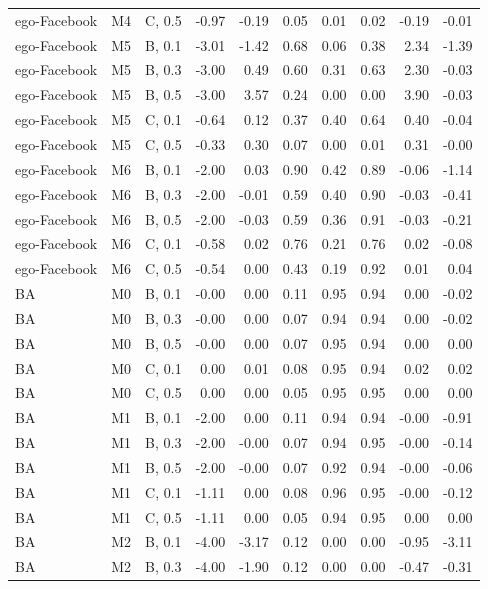 \begin{longtable}{lllrrrrrrr}
ego-Facebook & M4 & C, 0.5 & -0.97 & -0.19 & 0.05 & 0.01 & 0.02 & -0.19 & -0.01 \\
ego-Facebook & M5 & B, 0.1 & -3.01 & -1.42 & 0.68 & 0.06 & 0.38 & 2.34 & -1.39 \\
ego-Facebook & M5 & B, 0.3 & -3.00 & 0.49 & 0.60 & 0.31 & 0.63 & 2.30 & -0.03 \\
ego-Facebook & M5 & B, 0.5 & -3.00 & 3.57 & 0.24 & 0.00 & 0.00 & 3.90 & -0.03 \\
ego-Facebook & M5 & C, 0.1 & -0.64 & 0.12 & 0.37 & 0.40 & 0.64 & 0.40 & -0.04 \\
ego-Facebook & M5 & C, 0.5 & -0.33 & 0.30 & 0.07 & 0.00 & 0.01 & 0.31 & -0.00 \\
ego-Facebook & M6 & B, 0.1 & -2.00 & 0.03 & 0.90 & 0.42 & 0.89 & -0.06 & -1.14 \\
ego-Facebook & M6 & B, 0.3 & -2.00 & -0.01 & 0.59 & 0.40 & 0.90 & -0.03 & -0.41 \\
ego-Facebook & M6 & B, 0.5 & -2.00 & -0.03 & 0.59 & 0.36 & 0.91 & -0.03 & -0.21 \\
ego-Facebook & M6 & C, 0.1 & -0.58 & 0.02 & 0.76 & 0.21 & 0.76 & 0.02 & -0.08 \\
ego-Facebook & M6 & C, 0.5 & -0.54 & 0.00 & 0.43 & 0.19 & 0.92 & 0.01 & 0.04 \\
BA & M0 & B, 0.1 & -0.00 & 0.00 & 0.11 & 0.95 & 0.94 & 0.00 & -0.02 \\
BA & M0 & B, 0.3 & -0.00 & 0.00 & 0.07 & 0.94 & 0.94 & 0.00 & -0.02 \\
BA & M0 & B, 0.5 & -0.00 & 0.00 & 0.07 & 0.95 & 0.94 & 0.00 & 0.00 \\
BA & M0 & C, 0.1 & 0.00 & 0.01 & 0.08 & 0.95 & 0.94 & 0.02 & 0.02 \\
BA & M0 & C, 0.5 & 0.00 & 0.00 & 0.05 & 0.95 & 0.95 & 0.00 & 0.00 \\
BA & M1 & B, 0.1 & -2.00 & 0.00 & 0.11 & 0.94 & 0.94 & -0.00 & -0.91 \\
BA & M1 & B, 0.3 & -2.00 & -0.00 & 0.07 & 0.94 & 0.95 & -0.00 & -0.14 \\
BA & M1 & B, 0.5 & -2.00 & -0.00 & 0.07 & 0.92 & 0.94 & -0.00 & -0.06 \\
BA & M1 & C, 0.1 & -1.11 & 0.00 & 0.08 & 0.96 & 0.95 & -0.00 & -0.12 \\
BA & M1 & C, 0.5 & -1.11 & 0.00 & 0.05 & 0.94 & 0.95 & 0.00 & 0.00 \\
BA & M2 & B, 0.1 & -4.00 & -3.17 & 0.12 & 0.00 & 0.00 & -0.95 & -3.11 \\
BA & M2 & B, 0.3 & -4.00 & -1.90 & 0.12 & 0.00 & 0.00 & -0.47 & -0.31 \\

\end{longtable}
